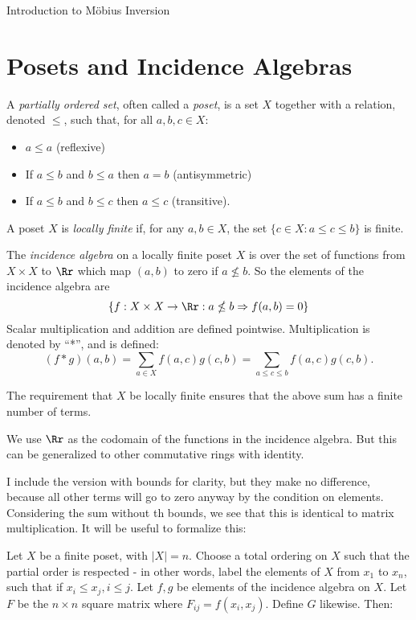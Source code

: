 \documentclass[12pt]{pom_thesis}
\begin{document}
\begin{chapter}{Introduction to M\"obius Inversion}
\section{Posets and Incidence Algebras}
\begin{defn}
A \emph{partially ordered set}, often called a \emph{poset}, is a set $X$ together with a relation, denoted $\leq$, such that, for all $a,b,c \in X$:
\begin{itemize}
\item $a \leq a$ (reflexive)
\item If $a \leq b$ and $b \leq a$ then $a = b$ (antisymmetric)
\item If $a \leq b$ and $b \leq c$ then $a \leq c$ (transitive).
\end{itemize}
\end{defn}
\begin{defn}
A poset $X$ is \emph{locally finite} if, for any $a,b \in X$, the set $\{c \in X : a \leq c \leq b\}$ is finite.
\end{defn}
\begin{defn}
The \emph{incidence algebra} on a locally finite poset $X$ is over the set of functions from $X \times X$ to $\Rr$ which map $(a,b)$ to zero if $a \nleq b$. So the elements of the incidence algebra are 
\[\{f:X \times X \rightarrow \Rr:a \nleq b \Rightarrow f(a,b) = 0\}
\]
Scalar multiplication and addition are defined pointwise.  Multiplication is denoted by ``*'', and is defined:
\[(f* g)(a,b) = \sum_{a \in X}f(a,c)g(c,b) = \sum_{a \leq c \leq b}f(a,c)g(c,b).\]
\end{defn}
\begin{rmk}
The requirement that $X$ be locally finite ensures that the above sum has a finite number of terms.
\end{rmk}
\begin{rmk}
We use $\Rr$ as the codomain of the functions in the incidence algebra. But this can be generalized to other commutative rings with identity.
\end{rmk}
I include the version with bounds for clarity, but they make no difference, because all other terms will go to zero anyway by the condition on elements. Considering the sum without th bounds, we see that this is identical to matrix multiplication. It will be useful to formalize this:
\begin{lemma}\label{mat_eq}
Let $X$ be a finite poset, with $|X|=n$. Choose a total ordering on $X$ such that the partial order is respected - in other words, label the elements of $X$ from $x_1$ to $x_n$, such that if $x_i \leq x_j, i \leq j$. Let $f,g$ be elements of the incidence algebra on $X$. Let $F$ be the $n\times n$ square matrix where $F_{ij}=f(x_i, x_j)$. Define $G$ likewise. Then:

\end{lemma}
\end{chapter}
\end{document}
